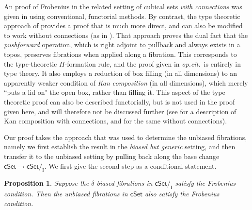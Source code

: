 \documentclass[11pt]{amsart}
\newcommand{\opcit}{\emph{op.cit.}}
\newcommand{\cSet}{\ensuremath{\mathsf{cSet}}}
\renewcommand{\to}{\ensuremath{\rightarrow}}
\newcommand{\I}{\ensuremath{\mathrm{I}}}
\newtheorem{proposition}[theorem]{Proposition}
\theoremstyle{remark}
\theoremstyle{definition}
\begin{document}
An proof of Frobenius in the related setting of cubical sets \emph{with connections} was given in \cite{GS} using conventional, functorial methods.  By contrast, the type theoretic approach of \cite{CCHM} provides a proof that is much more direct, and can also be modified to work without connections (as in \cite{AXYZ}).  That approach proves the dual fact that the \emph{pushforward} operation, which is right adjoint to pullback and always exists in a topos, preserves fibrations when applied along a fibration.  This corresponds to the type-theoretic $\Pi$-formation rule, and the proof given in \opcit\ is entirely in type theory.  It also employs a reduction of box filling (in all dimensions) to an apparently weaker condition of \emph{Kan composition} (in all dimensions), which merely ``puts a lid on" the open box, rather than filling it.  This aspect of the type theoretic proof can also be described functorially, but is not used in the proof given here, and will therefore not be discussed further (see \cite{LOPS} for a description of Kan composition with connections, and \cite{A:composition,filling,Frobenius,etc} for the same without connections).

Our proof takes the approach that was used to determine the unbiased fibrations, namely we first establish the result in the \emph{biased but generic} setting, and then transfer it to the unbiased setting by pulling back along the base change $\cSet\to\cSet/_\I$. We first give the second step as a conditional statement.

\begin{proposition}\label{prop:biasedFrobimpliesunbiasedFrob}
Suppose the $\delta$-biased fibrations in $\cSet/_\I$ satisfy the Frobenius condition. Then the unbiased fibrations in $\cSet$ also satisfy the Frobenius condition.
\end{proposition}
\end{document}

